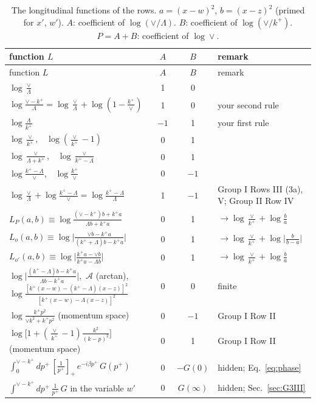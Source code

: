 \documentclass[10pt]{article}
\numberwithin{equation}{section}
\newcommand{\pp}{p^+}
\begin{document}
\begin{longtable}{@{}>{\raggedright\arraybackslash}p{}cc>{\raggedright\arraybackslash}p{}@{}}
\caption{The longitudinal functions of the rows. $a=(x-w)^2$, $b=(x-z)^2$ (primed for $x'$, $w'$). $A$: coefficient of $\log(\vee/\Lambda)$. $B$: coefficient of $\log(\vee/k^+)$. $P=A+B$: coefficient of $\log\vee$.}\label{tab:L}\\
\toprule
function $L$ & $A$ & $B$ & remark\\ \midrule\endfirsthead
\toprule function $L$ & $A$ & $B$ & remark\\ \midrule\endhead
$\log\frac{\vee}{\Lambda}$ & 1 & 0 & \\
$\log\frac{\vee-k^+}{\Lambda}=\log\frac{\vee}{\Lambda}+\log(1-\frac{k^+}{\vee})$ & 1 & 0 & your second rule\\
$\log\frac{\Lambda}{k^+}$ & $-1$ & 1 & your first rule\\
$\log\frac{\vee}{k^+}$,\ \ $\log(\frac{\vee}{k^+}-1)$ & 0 & 1 & \\
$\log\frac{\vee}{\Lambda+k^+}$,\ \ $\log\frac{\vee}{k^+-\Lambda}$ & 0 & 1 & \\
$\log\frac{k^+-\Lambda}{\vee}$,\ \ $\log\frac{k^+}{\vee}$ & 0 & $-1$ & \\
$\log\frac{\vee}{\Lambda}+\log\frac{k^+-\Lambda}{\vee}=\log\frac{k^+-\Lambda}{\Lambda}$ & 1 & $-1$ & Group I Rows III (3a), V; Group II Row IV\\
$L_P(a,b)\equiv\log\frac{(\vee-k^+)b+k^+a}{\Lambda b+k^+a}$ & 0 & 1 & $\to\log\frac{\vee}{k^+}+\log\frac{b}{a}$\\
$L_o(a,b)\equiv\log\Big|\frac{\vee b-k^+a}{(k^++\Lambda)b-k^+a}\Big|$ & 0 & 1 & $\to\log\frac{\vee}{k^+}+\log\big|\frac{b}{b-a}\big|$\\
$L_{o'}(a,b)\equiv\log\Big|\frac{k^+a-\vee b}{k^+a-\Lambda b}\Big|$ & 0 & 1 & $\to\log\frac{\vee}{k^+}+\log\frac{b}{a}$\\
$\log\Big|\frac{(k^+-\Lambda)b-k^+a}{\Lambda b-k^+a}\Big|$,\ $\mathcal A$ (arctan), $\log\frac{[k^+(x-w)-(k^+-\Lambda)(x-z)]^2}{[k^+(x-w)-\Lambda(x-z)]^2}$ & 0 & 0 & finite\\
$\log\frac{k^+p^2}{\vee k^2+k^+p^2}$ (momentum space) & 0 & $-1$ & Group I Row II\\
$\log\big[1+(\frac{\vee}{k^+}-1)\frac{k^2}{(k-p)^2}\big]$ (momentum space) & 0 & 1 & Group I Row II\\
$\int_0^{\vee-k^+}d\pp\,[\frac1{\pp}]_+\,e^{-i\beta\pp}\,G(\pp)$ & 0 & $-G(0)$ & hidden; Eq.~\eqref{eq:phase}\\
$\int^{\vee-k^+}d\pp\,\frac{1}{\pp}\,G$ in the variable $w'$ & 0 & $G(\infty)$ & hidden; Sec.~\ref{sec:G3III}\\
\bottomrule
\end{longtable}
\end{document}
